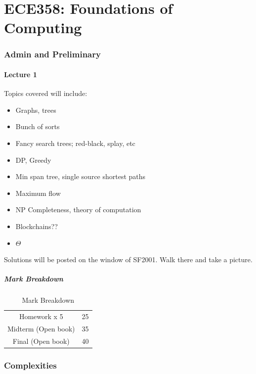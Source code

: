 \documentclass[../notes.tex]{subfiles}
\begin{document}
\part{ECE358: Foundations of Computing}


\section{Admin and Preliminary}

\subsection{Lecture 1}

Topics covered will include:
\begin{itemize}
	\item Graphs, trees
	\item Bunch of sorts
	\item Fancy search trees; red-black, splay, etc
	\item DP, Greedy
	\item Min span tree, single source shortest paths
	\item Maximum flow
	\item NP Completeness, theory of computation
	\item Blockchains??
	\item $ \Theta $ 
\end{itemize}

Solutions will be posted on the window of SF2001. Walk there and take a picture.

\subsubsection{Mark Breakdown}

\begin{table}[H]
	\centering
	\caption{Mark Breakdown}
	\begin{tabular}{|c|c|}
		\hline
		Homework x 5 & 25 \\
		Midterm (Open book) & 35 \\
		Final (Open book) & 40\\
		\hline
	\end{tabular}
\end{table}



\section{Complexities}
\end{document}
